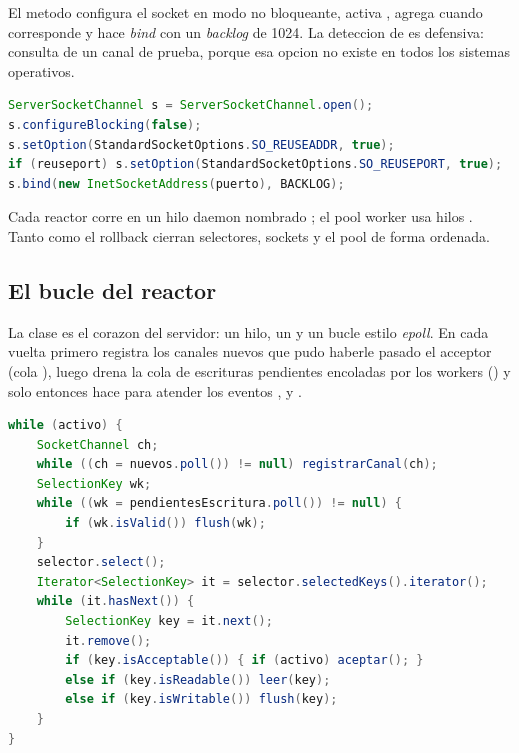 El metodo  configura el socket en modo no bloqueante, activa
, agrega  cuando corresponde y hace
\emph{bind} con un \emph{backlog} de 1024. La deteccion de 
es defensiva:  consulta
 de un canal de prueba, porque esa opcion no existe en
todos los sistemas operativos.

\begin{lstlisting}[language=Java,caption={Apertura no bloqueante del ServerSocketChannel}]
ServerSocketChannel s = ServerSocketChannel.open();
s.configureBlocking(false);
s.setOption(StandardSocketOptions.SO_REUSEADDR, true);
if (reuseport) s.setOption(StandardSocketOptions.SO_REUSEPORT, true);
s.bind(new InetSocketAddress(puerto), BACKLOG);
\end{lstlisting}

\begin{nota}
Cada reactor corre en un hilo daemon nombrado ; el pool
worker usa hilos . Tanto  como el rollback
 cierran selectores, sockets y el pool de forma ordenada.
\end{nota}

\subsection{El bucle del reactor}

La clase  es el corazon del servidor: un hilo, un
 y un bucle estilo \emph{epoll}. En cada vuelta primero registra
los canales nuevos que pudo haberle pasado el acceptor (cola ),
luego drena la cola de escrituras pendientes encoladas por los workers
() y solo entonces hace  para atender
los eventos ,  y .

\begin{lstlisting}[language=Java,caption={Bucle principal del Reactor}]
while (activo) {
    SocketChannel ch;
    while ((ch = nuevos.poll()) != null) registrarCanal(ch);
    SelectionKey wk;
    while ((wk = pendientesEscritura.poll()) != null) {
        if (wk.isValid()) flush(wk);
    }
    selector.select();
    Iterator<SelectionKey> it = selector.selectedKeys().iterator();
    while (it.hasNext()) {
        SelectionKey key = it.next();
        it.remove();
        if (key.isAcceptable()) { if (activo) aceptar(); }
        else if (key.isReadable()) leer(key);
        else if (key.isWritable()) flush(key);
    }
}
\end{lstlisting}

